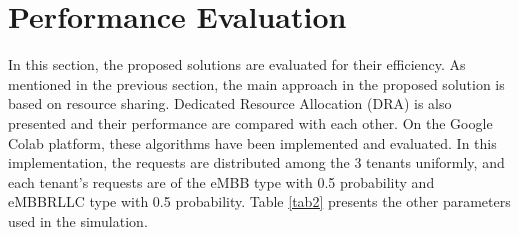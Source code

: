 \documentclass[conference]{IEEEtran}
\begin{document}
\section{Performance Evaluation}

In this section, the proposed solutions are evaluated for their efficiency. As mentioned in the previous section, the main approach in the proposed solution is based on resource sharing. Dedicated Resource Allocation (DRA) is also presented and their performance are compared with each other. On the Google Colab platform, these algorithms have been implemented and evaluated. In this implementation, the requests are distributed among the 3 tenants uniformly, and each tenant's requests are of the eMBB type with 0.5 probability and eMBBRLLC type with 0.5 probability. Table \ref{tab2} presents the other parameters used in the simulation.
\end{document}
